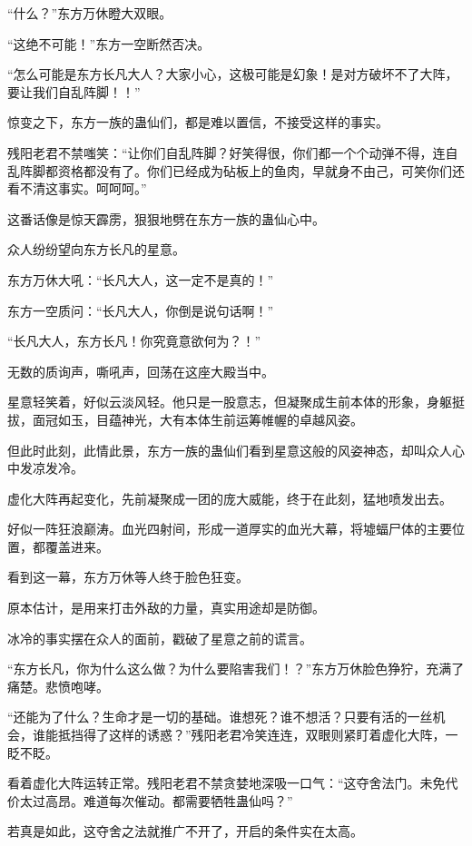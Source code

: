 
\begin{this_body}

“什么？”东方万休瞪大双眼。

“这绝不可能！”东方一空断然否决。

“怎么可能是东方长凡大人？大家小心，这极可能是幻象！是对方破坏不了大阵，要让我们自乱阵脚！！”

惊变之下，东方一族的蛊仙们，都是难以置信，不接受这样的事实。

残阳老君不禁嗤笑：“让你们自乱阵脚？好笑得很，你们都一个个动弹不得，连自乱阵脚都资格都没有了。你们已经成为砧板上的鱼肉，早就身不由己，可笑你们还看不清这事实。呵呵呵。”

这番话像是惊天霹雳，狠狠地劈在东方一族的蛊仙心中。

众人纷纷望向东方长凡的星意。

东方万休大吼：“长凡大人，这一定不是真的！”

东方一空质问：“长凡大人，你倒是说句话啊！”

“长凡大人，东方长凡！你究竟意欲何为？！”

无数的质询声，嘶吼声，回荡在这座大殿当中。

星意轻笑着，好似云淡风轻。他只是一股意志，但凝聚成生前本体的形象，身躯挺拔，面冠如玉，目蕴神光，大有本体生前运筹帷幄的卓越风姿。

但此时此刻，此情此景，东方一族的蛊仙们看到星意这般的风姿神态，却叫众人心中发凉发冷。

虚化大阵再起变化，先前凝聚成一团的庞大威能，终于在此刻，猛地喷发出去。

好似一阵狂浪巅涛。血光四射间，形成一道厚实的血光大幕，将墟蝠尸体的主要位置，都覆盖进来。

看到这一幕，东方万休等人终于脸色狂变。

原本估计，是用来打击外敌的力量，真实用途却是防御。

冰冷的事实摆在众人的面前，戳破了星意之前的谎言。

“东方长凡，你为什么这么做？为什么要陷害我们！？”东方万休脸色狰狞，充满了痛楚。悲愤咆哮。

“还能为了什么？生命才是一切的基础。谁想死？谁不想活？只要有活的一丝机会，谁能抵挡得了这样的诱惑？”残阳老君冷笑连连，双眼则紧盯着虚化大阵，一眨不眨。

看着虚化大阵运转正常。残阳老君不禁贪婪地深吸一口气：“这夺舍法门。未免代价太过高昂。难道每次催动。都需要牺牲蛊仙吗？”

若真是如此，这夺舍之法就推广不开了，开启的条件实在太高。


\end{this_body}
